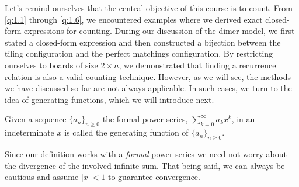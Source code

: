 Let's remind ourselves that the central objective of this course is to count. From \cref{q:1.1} through \cref{q:1.6}, we encountered examples where we derived exact closed-form expressions for counting. During our discussion of the dimer model, we first stated a closed-form expression and then constructed a bijection between the tiling configuration and the perfect matchings configuration. By restricting ourselves to boards of size $2 \times n$, we demonstrated that finding a recurrence relation is also a valid counting technique. However, as we will see, the methods we have discussed so far are not always applicable. In such cases, we turn to the idea of generating functions, which we will introduce next.

\begin{definition}
	Given a sequence $\{a_{n}\}_{n \ge 0}$ the formal power series, $\sum_{k=0}^{\infty}a_{k}x^k$, in an indeterminate $x$ is called the generating function of $\{a_{n}\}_{n \ge 0}$.
 \label{d:1.4}
\end{definition}

Since our definition works with a \textit{formal} power series we need not worry about the divergence of the involved infinite sum. That being said, we can always be cautious and assume $|x|<1$ to guarantee convergence. 

